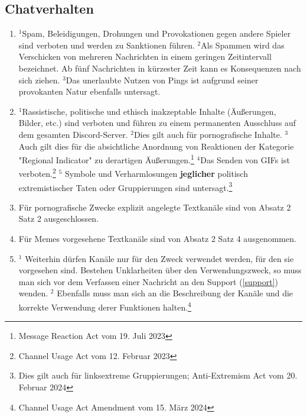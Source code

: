 \documentclass{article}
\begin{document}
\subsection{Chatverhalten}\label{verhalten}
\begin{enumerate}[(1)]
	\item $^{1}$Spam, Beleidigungen, Drohungen und Provokationen gegen andere Spieler sind verboten und werden zu Sanktionen führen. $^{2}$Als Spammen wird das Verschicken von mehreren Nachrichten in einem geringen Zeitintervall bezeichnet. Ab fünf Nachrichten in kürzester Zeit kann es Konsequenzen nach sich ziehen. $^{3}$Das unerlaubte Nutzen von Pings ist aufgrund seiner provokanten Natur ebenfalls untersagt.
	\item $^{1}$Rassistische, politische und ethisch inakzeptable Inhalte (Äußerungen, Bilder, etc.) sind verboten und führen zu einem permanenten Ausschluss auf dem gesamten Discord-Server. $^{2}$Dies gilt auch für pornografische Inhalte. $^{3}$Auch gilt dies für die absichtliche Anordnung von Reaktionen der Kategorie "Regional Indicator" zu derartigen Äußerungen.\footnote{Message Reaction Act vom 19. Juli 2023} $^{4}$Das Senden von GIFs ist verboten.\footnote{Channel Usage Act vom 12. Februar 2023} $^{5}$ Symbole und Verharmlosungen \textbf{jeglicher} politisch extremistischer Taten oder Gruppierungen sind untersagt.\footnote{Dies gilt auch für linksextreme Gruppierungen; Anti-Extremism Act vom 20. Februar 2024}
	\item Für pornografische Zwecke explizit angelegte Textkanäle sind von Absatz 2 Satz 2 ausgeschlossen.
	\item Für Memes vorgesehene Textkanäle sind von Absatz 2 Satz 4 ausgenommen.
	\item $^{1}$ Weiterhin dürfen Kanäle nur für den Zweck verwendet werden, für den sie vorgesehen sind. Bestehen Unklarheiten über den Verwendungszweck, so muss man sich vor dem Verfassen einer Nachricht an den Support (\ref{support}) wenden. 
		  $^{2}$ Ebenfalls muss man sich an die Beschreibung der Kanäle und die korrekte Verwendung derer Funktionen halten.\footnote{Channel Usage Act Amendment vom 15. März 2024}
\end{enumerate}
\end{document}
